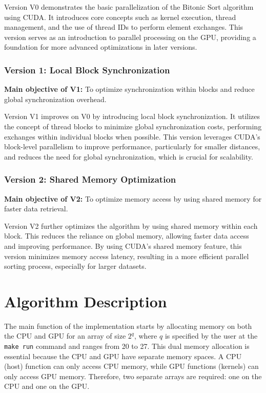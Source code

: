 \documentclass[a4paper,12pt]{article}
\begin{document}
Version V0 demonstrates the basic parallelization of the Bitonic Sort algorithm using CUDA. It introduces core concepts such as kernel execution, thread management, and the use of thread IDs to perform element exchanges. This version serves as an introduction to parallel processing on the GPU, providing a foundation for more advanced optimizations in later versions.

\subsubsection{Version 1: Local Block Synchronization}

\textbf{Main objective of V1:} To optimize synchronization within blocks and reduce global synchronization overhead.

Version V1 improves on V0 by introducing local block synchronization. It utilizes the concept of thread blocks to minimize global synchronization costs, performing exchanges within individual blocks when possible. This version leverages CUDA’s block-level parallelism to improve performance, particularly for smaller distances, and reduces the need for global synchronization, which is crucial for scalability.

\subsubsection{Version 2: Shared Memory Optimization}

\textbf{Main objective of V2:} To optimize memory access by using shared memory for faster data retrieval.

Version V2 further optimizes the algorithm by using shared memory within each block. This reduces the reliance on global memory, allowing faster data access and improving performance. By using CUDA’s shared memory feature, this version minimizes memory access latency, resulting in a more efficient parallel sorting process, especially for larger datasets.

\section{Algorithm Description}

The main function of the implementation starts by allocating memory on both the CPU and GPU for an array of size \(2^q\), where \(q\) is specified by the user at the \texttt{make run} command and ranges from 20 to 27. This dual memory allocation is essential because the CPU and GPU have separate memory spaces. A CPU (host) function can only access CPU memory, while GPU functions (kernels) can only access GPU memory. Therefore, two separate arrays are required: one on the CPU and one on the GPU. 
\end{document}
